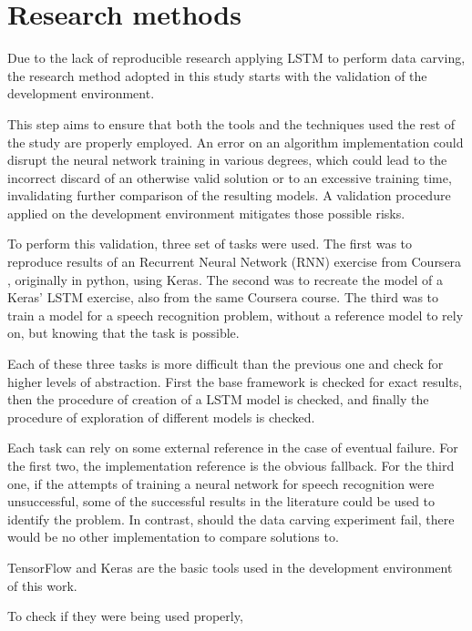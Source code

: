 \section{Research methods}

Due to the lack of reproducible research applying LSTM to perform data carving, the research method adopted in this study starts with the validation of the development environment. 

This step aims to ensure that both the tools and the techniques used the rest of the study are properly employed. An error on an algorithm implementation could disrupt the neural network training in various degrees, which could lead to the incorrect discard of an otherwise valid solution or to an excessive training time, invalidating further comparison of the resulting models. A validation procedure applied on the development environment mitigates those possible risks. 

To perform this validation, three set of tasks were used. The first was to reproduce results of an Recurrent Neural Network (RNN) exercise from Coursera , originally in python, using Keras. The second was to recreate the model of a Keras' LSTM exercise, also from the same Coursera course. The third was to train a model for a speech recognition problem, without a reference model to rely on, but knowing that the task is possible. 

Each of these three tasks is more difficult than the previous one and check for higher levels of abstraction. First the base framework is checked for exact results, then the procedure of creation of a LSTM model is checked, and finally the procedure of exploration of different models is checked.

Each task can rely on some external reference in the case of eventual failure. For the first two, the implementation reference is the obvious fallback. For the third one, if the attempts of training a neural network for speech recognition were unsuccessful, some of the successful results in the literature could be used to identify the problem. In contrast, should the data carving experiment fail, there would be no other implementation to compare solutions to.


TensorFlow \cite{abadi_tensorflow:_2016} and Keras \cite{chollet_keras_2019} are the basic tools used in the development environment of this work. 

To check if they were being used properly, 



